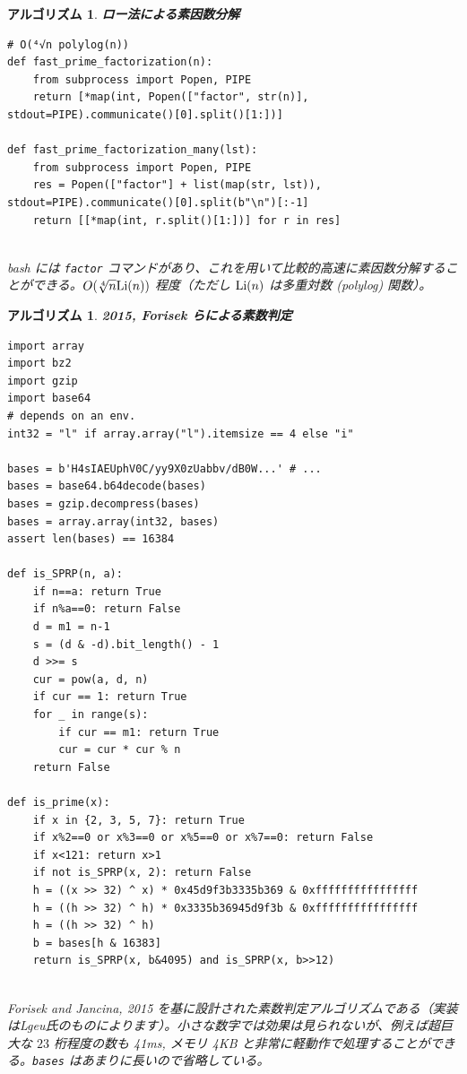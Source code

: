 \documentclass[12pt, a4j]{ltjsarticle}
\newtheorem{alg}[thm]{アルゴリズム}
\begin{document}
\begin{alg}{\bf ロー法による素因数分解}\upshape\\
\begin{lstlisting}
# O(⁴√n polylog(n))
def fast_prime_factorization(n):
    from subprocess import Popen, PIPE
    return [*map(int, Popen(["factor", str(n)], stdout=PIPE).communicate()[0].split()[1:])]

def fast_prime_factorization_many(lst):
    from subprocess import Popen, PIPE
    res = Popen(["factor"] + list(map(str, lst)), stdout=PIPE).communicate()[0].split(b"\n")[:-1]
    return [[*map(int, r.split()[1:])] for r in res]
\end{lstlisting}
\quad\\
bash には \lstinline{factor}
コマンドがあり、これを用いて比較的高速に素因数分解することができる。$O(\sqrt[4]{n}{\rm Li}(n))$ 程度（ただし ${\rm Li}(n)$ は多重対数 (polylog) 関数）。
\end{alg}

\vspace{1cm}

\begin{alg} {\bf 2015, Forisek らによる素数判定}\\\upshape
\begin{lstlisting}
import array
import bz2
import gzip
import base64
# depends on an env.
int32 = "l" if array.array("l").itemsize == 4 else "i"

bases = b'H4sIAEUphV0C/yy9X0zUabbv/dB0W...' # ...
bases = base64.b64decode(bases)
bases = gzip.decompress(bases)
bases = array.array(int32, bases)
assert len(bases) == 16384

def is_SPRP(n, a):
    if n==a: return True
    if n%a==0: return False
    d = m1 = n-1
    s = (d & -d).bit_length() - 1
    d >>= s
    cur = pow(a, d, n)
    if cur == 1: return True
    for _ in range(s):
        if cur == m1: return True
        cur = cur * cur % n
    return False

def is_prime(x):
    if x in {2, 3, 5, 7}: return True
    if x%2==0 or x%3==0 or x%5==0 or x%7==0: return False
    if x<121: return x>1
    if not is_SPRP(x, 2): return False
    h = ((x >> 32) ^ x) * 0x45d9f3b3335b369 & 0xffffffffffffffff
    h = ((h >> 32) ^ h) * 0x3335b36945d9f3b & 0xffffffffffffffff
    h = ((h >> 32) ^ h)
    b = bases[h & 16383]
    return is_SPRP(x, b&4095) and is_SPRP(x, b>>12)
\end{lstlisting}\itshape
\quad\\
Forisek and Jancina, 2015 を基に設計された素数判定アルゴリズムである（実装はLgeu氏のものによります）。小さな数字では効果は見られないが、\upshape 例えば超巨大な $23$ 桁程度の数も 41ms, メモリ 4KB と非常に軽動作で処理することができる。\lstinline{bases}
はあまりに長いので省略している。
\end{alg}
\end{document}
